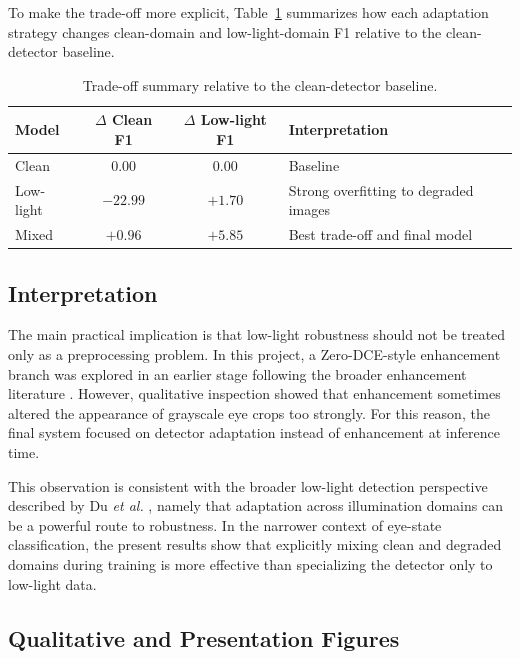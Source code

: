 \documentclass[conference]{IEEEtran}
\begin{document}
To make the trade-off more explicit, Table~\ref{tab:tradeoff_summary} summarizes how each adaptation strategy changes clean-domain and low-light-domain F1 relative to the clean-detector baseline.

\begin{table}[!t]
\caption{Trade-off summary relative to the clean-detector baseline.}
\label{tab:tradeoff_summary}
\centering
\footnotesize
\setlength{\tabcolsep}{4.5pt}
\begin{tabular}{>{\raggedright\arraybackslash}p{1.45cm}cc>{\raggedright\arraybackslash}p{1.35cm}}
\toprule
Model & $\Delta$ Clean F1 & $\Delta$ Low-light F1 & Interpretation \\
\midrule
Clean & 0.00 & 0.00 & Baseline \\
Low-light & $-22.99$ & $+1.70$ & Strong overfitting to degraded images \\
Mixed & $+0.96$ & $+5.85$ & Best trade-off and final model \\
\bottomrule
\end{tabular}
\end{table}

\subsection{Interpretation}

The main practical implication is that low-light robustness should not be treated only as a preprocessing problem. In this project, a Zero-DCE-style enhancement branch was explored in an earlier stage following the broader enhancement literature \cite{guo2020}. However, qualitative inspection showed that enhancement sometimes altered the appearance of grayscale eye crops too strongly. For this reason, the final system focused on detector adaptation instead of enhancement at inference time.

This observation is consistent with the broader low-light detection perspective described by Du \emph{et al.} \cite{du2024}, namely that adaptation across illumination domains can be a powerful route to robustness. In the narrower context of eye-state classification, the present results show that explicitly mixing clean and degraded domains during training is more effective than specializing the detector only to low-light data.

\subsection{Qualitative and Presentation Figures}
\end{document}
